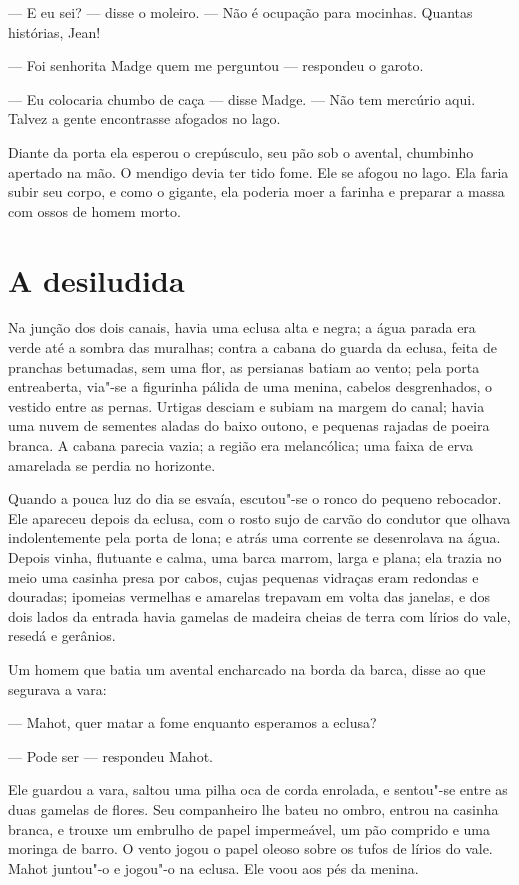 --- E eu sei? --- disse o moleiro. --- Não é ocupação para mocinhas. Quantas
histórias, Jean!

--- Foi senhorita Madge quem me perguntou --- respondeu o garoto.

--- Eu colocaria chumbo de caça --- disse Madge. --- Não tem mercúrio aqui.
Talvez a gente encontrasse afogados no lago.

Diante da porta ela esperou o crepúsculo, seu pão sob o avental,
chumbinho apertado na mão. O mendigo devia ter tido fome. Ele se afogou no
lago. Ela faria subir seu corpo, e como o gigante, ela poderia moer a
farinha e preparar a massa com ossos de homem morto.

\section*{A desiludida}

Na junção dos dois canais, havia uma eclusa alta e negra; a água parada
era verde até a sombra das muralhas; contra a cabana do guarda da eclusa,
feita de pranchas betumadas, sem uma flor, as persianas batiam ao vento;
pela porta entreaberta, via"-se a figurinha pálida de uma menina, cabelos
desgrenhados, o vestido entre as pernas. Urtigas desciam e subiam na
margem do canal; havia uma nuvem de sementes aladas do baixo outono, e
pequenas rajadas de poeira branca. A cabana parecia vazia; a região era
melancólica; uma faixa de erva amarelada se perdia no horizonte.

Quando a pouca luz do dia se esvaía, escutou"-se o ronco do pequeno
rebocador. Ele apareceu depois da eclusa, com o rosto sujo de carvão do
condutor que olhava indolentemente pela porta de lona; e atrás uma
corrente se desenrolava na água. Depois vinha, flutuante e calma, uma
barca marrom, larga e plana; ela trazia no meio uma casinha presa por
cabos, cujas pequenas vidraças eram redondas e douradas; ipomeias
vermelhas e amarelas trepavam em volta das janelas, e dos dois lados da
entrada havia gamelas de madeira cheias de terra com lírios do vale,
resedá e gerânios.

Um homem que batia um avental encharcado na borda da barca, disse ao
que segurava a vara:

--- Mahot, quer matar a fome enquanto esperamos a eclusa?

--- Pode ser --- respondeu Mahot.

Ele guardou a vara, saltou uma pilha oca de corda enrolada, e sentou"-se
entre as duas gamelas de flores. Seu companheiro lhe bateu no ombro,
entrou na casinha branca, e trouxe um embrulho de papel impermeável, um
pão comprido e uma moringa de barro. O vento jogou o papel oleoso
sobre os tufos de lírios do vale. Mahot juntou"-o e jogou"-o na eclusa. Ele
voou aos pés da menina.

